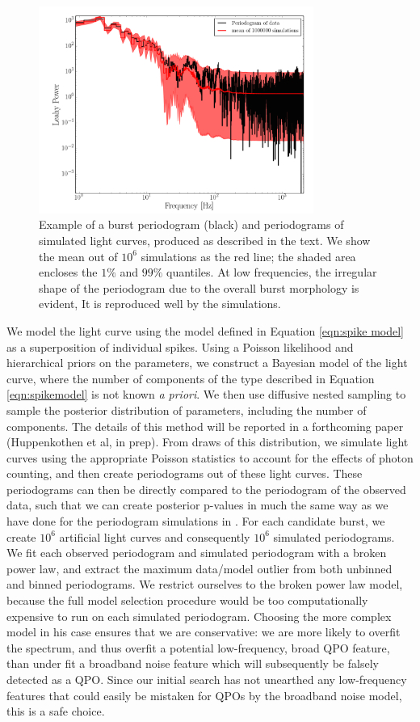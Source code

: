 \documentclass[numberedappendix]{emulateapj}
\begin{document}
\label{sec:dnest}
\begin{figure}[htbp]
\begin{center}
\includegraphics[width=9cm]{example_burst_lcmodel_ps.png}
\caption{Example of a burst periodogram (black) and periodograms of simulated light curves, produced as described in the text. We show the mean out of $10^6$ simulations as the red line; the shaded area encloses the $1\%$ and $99\%$ quantiles. At low frequencies, the irregular shape
of the periodogram due to the overall burst morphology is evident, It is reproduced well by the simulations.}
\label{fig:burst_lcmodel_ps}
\end{center}
\end{figure}


We model the light curve using the model defined in Equation \ref{eqn:spike model} as a superposition of individual spikes. Using a Poisson likelihood and hierarchical priors on the parameters, we construct a Bayesian model of the light curve, where the number of components of the type described in Equation \ref{eqn:spikemodel} is not known {\it a priori}. We then use diffusive nested sampling \citep{brewer2011} to sample the posterior distribution of parameters, including the number of components. The details of this method will be reported in a forthcoming paper (Huppenkothen et al, in prep). From draws of this distribution, we simulate light curves using the appropriate Poisson statistics to account for the effects of photon counting, and then create periodograms out of these light curves. These periodograms can then be directly compared to the periodogram of the observed data, such that we can create posterior p-values in much the same way as we have done for the periodogram simulations in \citep{huppenkothen2013}. For each candidate burst, we create $10^6$ artificial light curves and consequently $10^6$ simulated periodograms. We fit each observed periodogram and simulated periodogram with a broken power law, and extract the maximum data/model outlier from both unbinned and binned periodograms. We restrict ourselves to the broken power law model, because the full model selection procedure would be too computationally expensive to run on each simulated periodogram. Choosing the more complex model in his case ensures that we are conservative: we are more likely to overfit the spectrum, and thus overfit a potential low-frequency, broad QPO feature, than under fit a broadband noise feature which will subsequently be falsely detected as a QPO. Since our initial search has not unearthed any low-frequency features that could easily be mistaken for QPOs by the broadband noise model, this is a safe choice.
\end{document}
